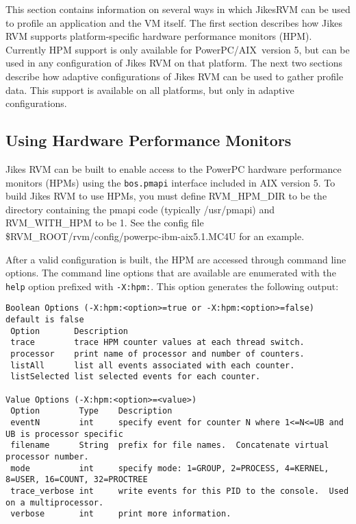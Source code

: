 This section contains information on several ways in which
Jikes\trademark RVM can be used to profile an application and the VM
itself.  The first section describes how Jikes RVM supports
platform-specific hardware performance monitors (HPM). Currently HPM
support is only available for
PowerPC\PowerPCTMFootnote/AIX\AIXTMFootnote\ version 5, but can be
used in any configuration of Jikes RVM on that platform.  The next two
sections describe how adaptive configurations of Jikes RVM can be used
to gather profile data.  This support is available on all platforms,
but only in adaptive configurations.

\AIXPPCJikesTMFooter

\subsection{Using Hardware Performance Monitors}

Jikes RVM can be built to enable access to the PowerPC hardware
performance monitors (HPMs) using the {\tt bos.pmapi} interface 
included in AIX version 5. To build Jikes RVM to use
HPMs, you must define RVM\_HPM\_DIR to be the directory containing
the pmapi code (typically /usr/pmapi) and RVM\_WITH\_HPM to be 1.
See the config file \$RVM\_ROOT/rvm/config/powerpc-ibm-aix5.1.MC4U for
an example.

After a valid configuration is built, the HPM are accessed through 
command line options. 
The command line options that are available are enumerated with the 
{\tt help} option prefixed with {\tt -X:hpm:}.  This option
generates the following output:
%
\begin{verbatim}
Boolean Options (-X:hpm:<option>=true or -X:hpm:<option>=false) default is false
 Option       Description
 trace        trace HPM counter values at each thread switch.
 processor    print name of processor and number of counters.
 listAll      list all events associated with each counter.
 listSelected list selected events for each counter.

Value Options (-X:hpm:<option>=<value>)
 Option        Type    Description
 eventN        int     specify event for counter N where 1<=N<=UB and UB is processor specific
 filename      String  prefix for file names.  Concatenate virtual processor number.
 mode          int     specify mode: 1=GROUP, 2=PROCESS, 4=KERNEL, 8=USER, 16=COUNT, 32=PROCTREE
 trace_verbose int     write events for this PID to the console.  Used on a multiprocessor.
 verbose       int     print more information.
\end{verbatim}

